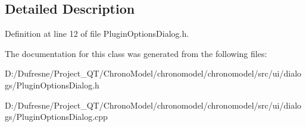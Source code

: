 \subsection{Detailed Description}


Definition at line 12 of file Plugin\-Options\-Dialog.\-h.



The documentation for this class was generated from the following files\-:\begin{DoxyCompactItemize}
\item 
D\-:/\-Dufresne/\-Project\-\_\-\-Q\-T/\-Chrono\-Model/chronomodel/chronomodel/src/ui/dialogs/Plugin\-Options\-Dialog.\-h\item 
D\-:/\-Dufresne/\-Project\-\_\-\-Q\-T/\-Chrono\-Model/chronomodel/chronomodel/src/ui/dialogs/Plugin\-Options\-Dialog.\-cpp\end{DoxyCompactItemize}
